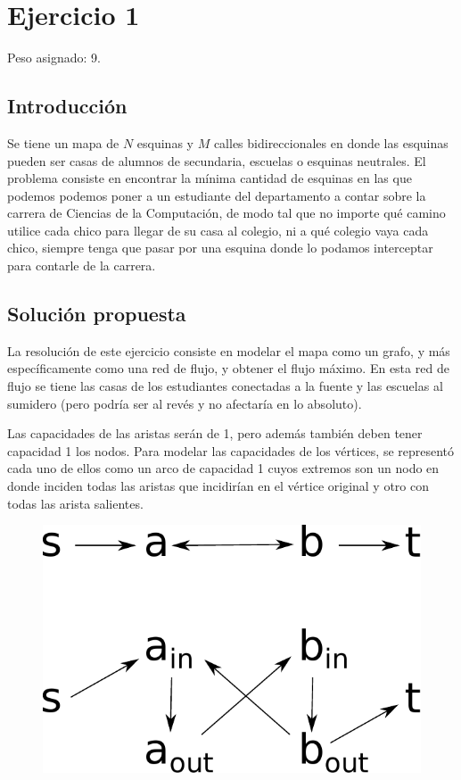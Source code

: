 \section{Ejercicio 1}

Peso asignado: 9.

\subsection{Introducción}

Se tiene un mapa de $N$ esquinas y $M$ calles bidireccionales en donde las
esquinas pueden ser casas de alumnos de secundaria, escuelas o esquinas
neutrales. El problema consiste en encontrar la mínima cantidad de esquinas en
las que podemos podemos poner a un estudiante del departamento a contar sobre
la carrera de Ciencias de la Computación, de modo tal que no importe qué
camino utilice cada chico para llegar de su casa al colegio, ni a qué colegio
vaya cada chico, siempre tenga que pasar por una esquina donde lo podamos
interceptar para contarle de la carrera.

\subsection{Solución propuesta}

La resolución de este ejercicio consiste en modelar el mapa como un grafo, y
más específicamente como una red de flujo, y obtener el flujo máximo. En esta
red de flujo se tiene las casas de los estudiantes conectadas a la fuente y
las escuelas al sumidero (pero podría ser al revés y no afectaría en lo
absoluto).

Las capacidades de las aristas serán de 1, pero además también deben tener
capacidad 1 los nodos. Para modelar las capacidades de los vértices, se
representó cada uno de ellos como un arco de capacidad 1 cuyos extremos son un
nodo en donde inciden todas las aristas que incidirían en el vértice original
y otro con todas las arista salientes.

\begin{figure}[H]
\centering
\includegraphics[scale=0.6]{imagenes/ej1_capacidades_nodos.pdf}
\end{figure}


